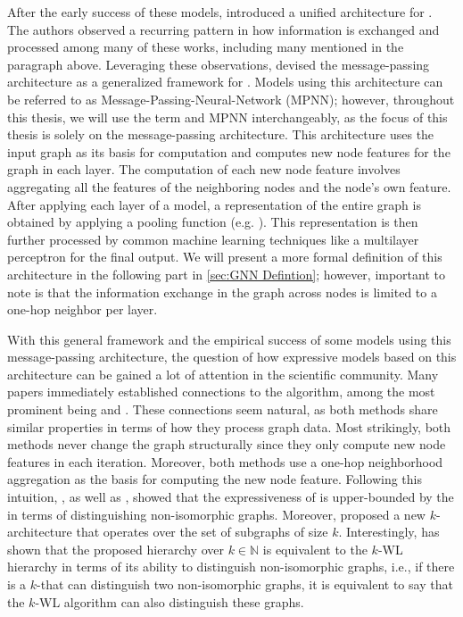 After the early success of these \gnn models, \cite{Gil+2017} introduced a unified architecture for \gnns. The authors observed a recurring pattern in how information is exchanged and processed among many of these works, including many mentioned in the paragraph above. Leveraging these observations, \cite{Gil+2017} devised the message-passing architecture as a generalized framework for \gnns. Models using this architecture can be referred to as Message-Passing-Neural-Network (\textsf{MPNN}); however, throughout this thesis, we will use the term \gnn and \textsf{MPNN} interchangeably, as the focus of this thesis is solely on the message-passing architecture. 
This architecture uses the input graph as its basis for computation and computes new node features for the graph in each layer. The computation of each new node feature involves aggregating all the features of the neighboring nodes and the node's own feature. After applying each layer of a \gnn model, a representation of the entire graph is obtained by applying a pooling function (e.g. \cite{Ying2018}). This representation is then further processed by common machine learning techniques like a multilayer perceptron for the final output. We will present a more formal definition of this architecture in the following part in \cref{sec:GNN Defintion}; however, important to note is that the information exchange in the graph across nodes is limited to a one-hop neighbor per layer.
 
With this general framework and the empirical success of some models using this message-passing architecture, the question of how expressive models based on this architecture can be gained a lot of attention in the scientific community. Many papers immediately established connections to the \wl algorithm, among the most prominent being \cite{Morris2018} and \cite{Xu2018}. These connections seem natural, as both methods share similar properties in terms of how they process graph data. Most strikingly, both methods never change the graph structurally since they only compute new node features in each iteration. Moreover, both methods use a one-hop neighborhood aggregation as the basis for computing the new node feature. Following this intuition, \cite{Morris2018}, as well as \cite{Xu2018}, showed that the expressiveness of \gnns is upper-bounded by the \wl in terms of distinguishing non-isomorphic graphs. Moreover, \cite{Morris2018} proposed a new $k$-\gnn architecture that operates over the set of subgraphs of size $k$. Interestingly, \cite{Geerts2020} has shown that the proposed hierarchy over $k \in \mathbb{N}$ is equivalent to the $k$-WL hierarchy in terms of its ability to distinguish non-isomorphic graphs, i.e., if there is a $k$-\gnn that can distinguish two non-isomorphic graphs, it is equivalent to say that the $k$-WL algorithm can also distinguish these graphs.

